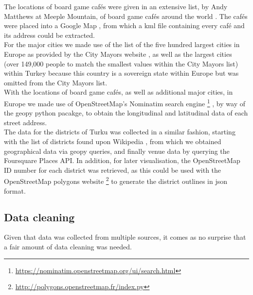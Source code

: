 \documentclass{article}
\begin{document}
    The locations of board game caf\'es were given in an extensive list, by Andy Matthews at Meeple Mountain, of board game caf\'es around the world \cite{Meeple}.
    The caf\'es were placed into a Google Map \cite{MeepleMap}, from which a kml file containing every caf\'e and its address could be extracted.\\

    For the major cities we made use of the list of the five hundred largest cities in Europe as provided by the City Mayors website \cite{CityMayors}, as well as the largest cities (over 149,000 people to match the smallest values within the City Mayors list) within Turkey \cite{WikiTurkey} because this country is a sovereign state within Europe but was omitted from the City Mayors list.\\

    With the locations of board game caf\'es, as well as additional major cities, in Europe we made use of OpenStreetMap's Nominatim search engine%
    \footnote{
        \url{https://nominatim.openstreetmap.org/ui/search.html}
    }%
    , by way of the geopy python pacakge, to obtain the longitudinal and latitudinal data of each street address.\\

    The data for the districts of Turku was collected in a similar fashion, starting with the list of districts found upon Wikipedia \cite{WikiTurku}, from which we obtained geographical data via geopy queries, and finally venue data by querying the Foursquare Places API. 
    In addition, for later visualisation, the OpenStreetMap ID number for each district was retrieved, as this could be used with the OpenStreetMap polygons website%
    \footnote{
        \url{http://polygons.openstreetmap.fr/index.py}
    }%
    to generate the district outlines in json format.

    \subsection{Data cleaning}

    Given that data was collected from multiple sources, it comes as no surprise that a fair amount of data cleaning was needed.\\
    
\end{document}

